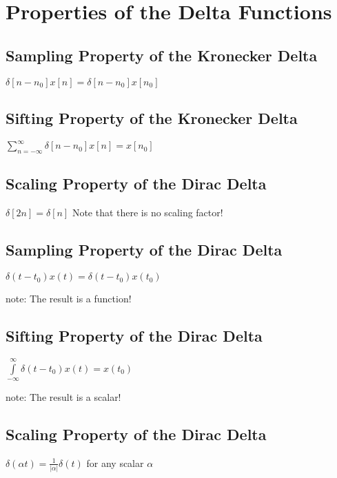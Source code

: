 \documentclass[11pt]{article}
\begin{document}
\section{Properties of the Delta Functions}

\subsection{Sampling Property of the Kronecker Delta}
$\delta[n-n_0]x[n] = \delta[n-n_0]x[n_0]$

\subsection{Sifting Property of the Kronecker Delta}
$\sum\limits_{n=-\infty}^\infty \delta[n-n_0]x[n] = x[n_0]$

\subsection{Scaling Property of the Dirac Delta}
$\delta[2n]=\delta[n]$ Note that there is no scaling factor!

\subsection{Sampling Property of the Dirac Delta}
$\delta(t-t_0)x(t) = \delta(t-t_0)x(t_0)$

note: The result is a function!

\subsection{Sifting Property of the Dirac Delta}
$\int\limits_{-\infty}^\infty \delta(t-t_0)x(t) = x(t_0)$

note: The result is a scalar!

\subsection{Scaling Property of the Dirac Delta}

$\delta(\alpha t)= \frac{1}{|\alpha|} \delta(t)$ for any scalar $\alpha$
\end{document}
